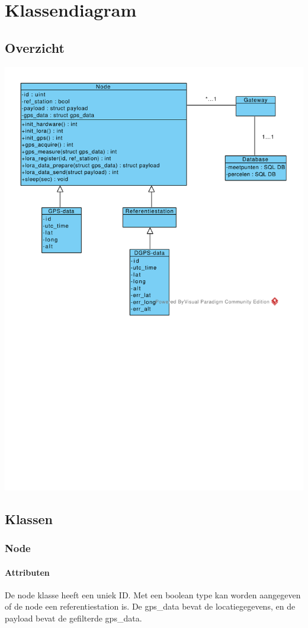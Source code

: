 \section{Klassendiagram}
\subsection{Overzicht}
\includegraphics[width=\textwidth]{technical/class_diagram.pdf}

\subsection{Klassen}
\subsubsection{Node}
\paragraph{Attributen}
De node klasse heeft een uniek ID. Met een boolean type kan worden aangegeven of de node een referentiestation is. De gps\_data bevat de locatiegegevens, en de payload bevat de gefilterde gps\_data.

